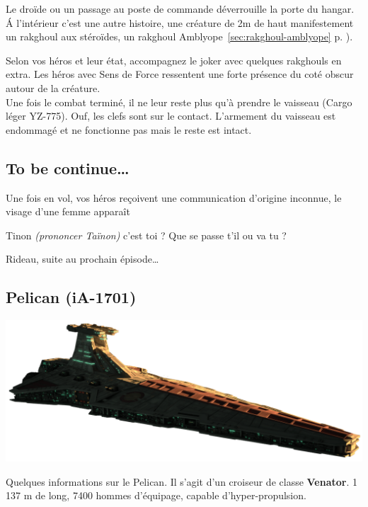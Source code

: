 Le droïde ou un passage au poste de commande déverrouille la porte du hangar. \'A l’intérieur c’est une autre histoire, une créature de 2m de haut manifestement un rakghoul aux stéroïdes, un rakghoul Amblyope~\ref{sec:rakghoul-amblyope} p. \pageref{sec:rakghoul-amblyope}).

Selon vos héros et leur état, accompagnez le joker avec quelques rakghouls en extra. Les héros avec Sens de Force ressentent une forte présence du coté obscur autour de la créature.\\

Une fois le combat terminé, il ne leur reste plus qu’à prendre le vaisseau (Cargo léger YZ-775). Ouf, les clefs sont sur le contact. L’armement du vaisseau est endommagé et ne fonctionne pas mais le reste est intact.

\subsection{To be continue\ldots}
Une fois en vol, vos héros reçoivent une communication d’origine inconnue, le visage d’une femme apparaît

\begin{quotebox}
	Tinon \emph{(prononcer Taïnon)} c’est toi ? Que se passe t’il ou va tu ?
\end{quotebox}

Rideau, suite au prochain épisode\ldots


\clearpage
\subsection{Pelican (iA-1701)}
\includegraphics[width=\textwidth]{_img/dos-au-muur/venator.png}
\vspace{-4\baselineskip}

Quelques informations sur le Pelican. Il s’agit d’un croiseur de classe \textbf{Venator}. 1 137 m de long, 7400 hommes d’équipage, capable d’hyper-propulsion.

